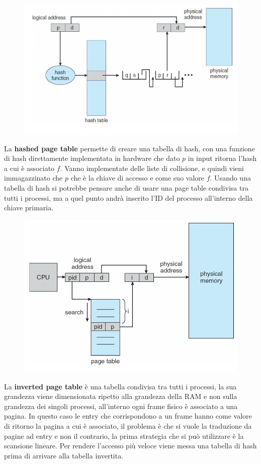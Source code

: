 \documentclass[12pt]{article}
\begin{document}
\begin{figure}
  \centering
  \includegraphics[width=.9\linewidth]{hashed-page-table.png}
\end{figure}
La \textbf{hashed page table} permette di creare una tabella di hash, con una funzione di hash direttamente implementata in hardware che dato $p$ in input ritorna l'hash a cui \`e associato $f$. Vanno implementate delle liste di collisione, e quindi vieni immagazzinato che $p$ che \`e la chiave di accesso e come suo valore $f$. Usando una tabella di hash si potrebbe pensare anche di usare una page table condivisa tra tutti i processi, ma a quel punto andr\`a inserito l'ID del processo all'interno della chiave primaria.

\begin{figure}
  \centering
  \includegraphics[width=1\linewidth]{inverted-page-table.png}
\end{figure}
La \textbf{inverted page table} \`e una tabella condivisa tra tutti i processi, la sua grandezza viene dimensionata ripetto alla grandezza della RAM e non sulla grandezza dei singoli processi, all'interno ogni frame fisico \`e associato a una pagina. In questo caso le entry che corrispondono a un frame hanno come valore di ritorno la pagina a cui \`e associato, il problema \`e che si vuole la traduzione da pagine ad entry e non il contrario, la prima strategia che si pu\`o utilizzare \`e la scansione lineare. Per rendere l'accesso pi\`u veloce viene messa una tabella di hash prima di arrivare alla tabella invertita.
\end{document}
